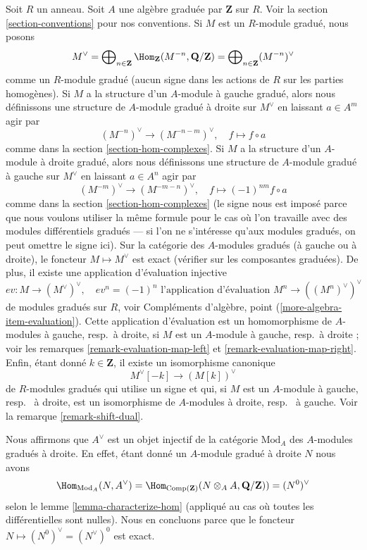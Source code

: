 \medskip\noindent
Soit $R$ un anneau. Soit $A$ une algèbre graduée par $\mathbf{Z}$ sur $R$. Voir
la section \ref{section-conventions} pour nos conventions. Si
$M$ est un $R$-module gradué, nous posons
$$
M^\vee =
\bigoplus\nolimits_{n \in \mathbf{Z}}
\Hom_\mathbf{Z}(M^{-n}, \mathbf{Q}/\mathbf{Z}) =
\bigoplus\nolimits_{n \in \mathbf{Z}} (M^{-n})^\vee
$$
comme un $R$-module gradué (aucun signe dans les actions de $R$ sur
les parties homogènes). Si $M$ a la structure d'un $A$-module à gauche
gradué, alors nous définissons une structure de $A$-module gradué à droite
sur $M^\vee$ en laissant $a \in A^m$ agir par
$$
(M^{-n})^\vee \to (M^{-n - m})^\vee, \quad
f \mapsto f \circ a
$$
comme dans la section
\ref{section-hom-complexes}. Si $M$ a la structure d'un $A$-module à droite
gradué, alors nous définissons une structure de $A$-module gradué à
gauche sur $M^\vee$ en laissant $a \in A^n$ agir par
$$
(M^{-m})^\vee \to (M^{-m - n})^\vee, \quad
f \mapsto (-1)^{nm}f \circ a
$$
comme dans la section \ref{section-hom-complexes} (le signe nous est imposé
parce que nous voulons utiliser la même formule pour le cas où
l'on travaille avec des modules différentiels gradués --- si l'on ne
s'intéresse qu'aux modules gradués, on peut omettre le signe ici). Sur la
catégorie des $A$-modules gradués (à gauche ou à droite), le foncteur $M
\mapsto M^\vee$ est exact (vérifier sur les composantes graduées). De
plus, il existe une application d'évaluation injective
$$
ev : M \longrightarrow (M^\vee)^\vee, \quad
ev^n = (-1)^n \text{ l'application d'évaluation }M^n \to ((M^n)^\vee)^\vee
$$
de modules gradués sur $R$,
voir Compléments d'algèbre, point (\ref{more-algebra-item-evaluation}).
Cette application d'évaluation est un homomorphisme de $A$-modules à gauche, resp.\ à droite,
si $M$ est un $A$-module à gauche, resp.\ à
droite ; voir les remarques \ref{remark-evaluation-map-left} et
\ref{remark-evaluation-map-right}. Enfin, étant donné $k \in \mathbf{Z}$, il existe un isomorphisme canonique
$$
M^\vee[-k] \longrightarrow (M[k])^\vee
$$
de $R$-modules gradués qui utilise un signe et qui, si $M$
est un $A$-module à gauche, resp. \ à droite, est un isomorphisme de
$A$-modules à droite, resp. \ à gauche. Voir la remarque \ref{remark-shift-dual}.

\medskip\noindent
Nous affirmons que $A^\vee$ est un objet injectif de la catégorie
$\text{Mod}_A$ des $A$-modules gradués à droite. En effet, étant donné un
$A$-module gradué à droite $N$ nous avons
$$
\Hom_{\text{Mod}_A}(N, A^\vee) =
\Hom_{\text{Comp}(\mathbf{Z})}(N \otimes_A A, \mathbf{Q}/\mathbf{Z})) =
(N^0)^\vee
$$
selon le lemme
\ref{lemma-characterize-hom} (appliqué au cas où toutes les différentielles sont nulles).
Nous en concluons parce que le foncteur $N \mapsto (N^0)^\vee = (N^\vee)^0$
est exact.

